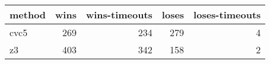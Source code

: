 \begin{tabular}{lrrrr}
\hline
 method   &   wins &   wins-timeouts &   loses &   loses-timeouts \\
\hline
 cvc5     &    269 &             234 &     279 &                4 \\
 z3       &    403 &             342 &     158 &                2 \\
\hline
\end{tabular}
